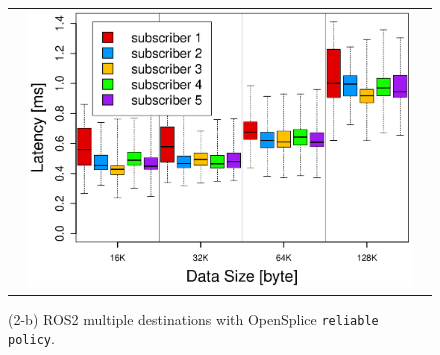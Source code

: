 \documentclass{article}
\begin{document}
\begin{enumerate}
\begin{figure}[h]
\begin{tabular}{ccc}
\begin{minipage}[t]{0.31\textwidth}
        \label{fig:ospl_multi}
      \end{minipage}
      &
      \begin{minipage}[t]{0.31\textwidth}
        \includegraphics[width=1.0\linewidth]{../../figure/BoxPlot_ospl_128K_multi-pub5.eps}
        \caption{(2-b) ROS2 multiple destinations with OpenSplice \texttt{reliable policy}.}
        \label{fig:ospl_multi_128K}
      \end{minipage}
    \end{tabular}
  \end{figure}

\end{enumerate}

\clearpage
\end{document}
